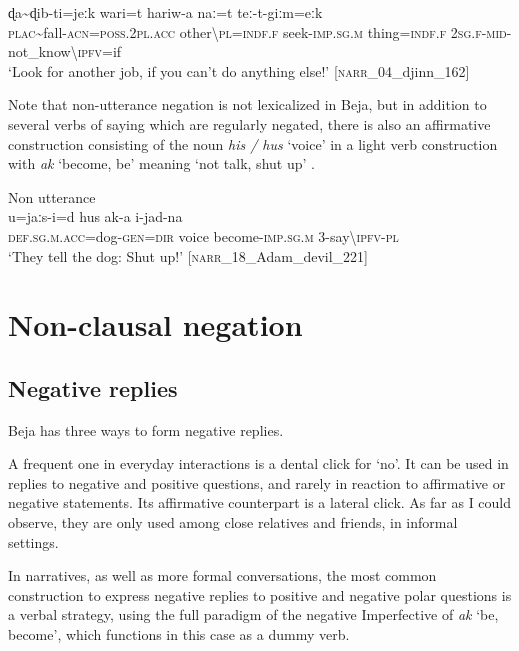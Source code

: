 \documentclass[output=paper,colorlinks,citecolor=brown]{langscibook}
\begin{document}
    \ex\label{ex:beja:28d}
         \gll ɖa{\textasciitilde}ɖib-ti=jeːk wari=t hariw-a naː=t teː-t-giːm=eːk\\
             \textsc{plac}{\textasciitilde}fall-\textsc{acn=poss.2pl.acc} other{\textbackslash}\textsc{pl=indf.f} seek-\textsc{imp.sg.m} thing=\textsc{indf.f} \textsc{2sg.f-mid}-not\_know{\textbackslash}\textsc{ipfv}=if\\
        \glt `Look for another job, if you can’t do anything else!' [\textsc{narr}\_04\_djinn\_162]
    \z
\z 

Note that non-utterance negation is not lexicalized in Beja, but in addition to several verbs of saying which are regularly negated, there is also an affirmative construction consisting of the noun \textit{his / hus} ‘voice’ in a light verb construction with \textit{ak} ‘become, be’ meaning ‘not talk, shut up’ .

\ea\label{ex:beja:29}
{Non utterance}\\
    \gll u=jaːs-i=d hus ak-a i-jad-na\\
         \textsc{def.sg.m.acc}=dog-\textsc{gen=dir} voice become-\textsc{imp.sg.m} \textsc{3}-say{\textbackslash}\textsc{ipfv-pl}\\
    \glt `They tell the dog: Shut up!' [\textsc{narr}\_18\_Adam\_devil\_221]
\z

\section{Non-clausal negation}

\subsection{Negative replies}

Beja has three ways to form negative replies. 

A frequent one in everyday interactions is a dental click for ‘no’. It can be used in replies to negative and positive questions, and rarely in reaction to affirmative or negative statements. Its affirmative counterpart is a lateral click. As far as I could observe, they are only used among close relatives and friends, in informal settings.

In narratives, as well as more formal conversations, the most common construction to express negative replies to positive and negative polar questions is a verbal strategy, using the full paradigm of the negative Imperfective of \textit{ak} ‘be, become’, which functions in this case as a dummy verb.
\end{document}
